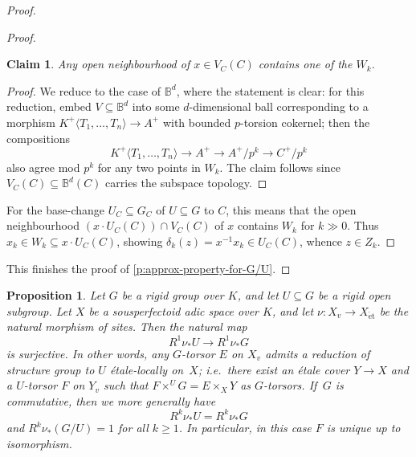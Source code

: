 \documentclass[11pt]{amsart}
\numberwithin{equation}{section}
\newtheorem{Proposition}[thm]{Proposition}
\newtheorem{Claim}[thm]{Claim}
\theoremstyle{definition}
\theoremstyle{remark}
\newcommand{\lra}{\longrightarrow}
\newcommand{\B}{\mathbb{B}}
\newcommand{\et}{{\operatorname{\acute{e}t}}}
\begin{document}
\begin{proof}
\begin{proof}
		\begin{Claim}
		Any open neighbourhood of $x\in V_C(C)$ contains one of the $W_k$.
		\end{Claim}

                \begin{proof}
		 We reduce to the case of $\B^d$, where the statement is clear: for this reduction, embed $V\subseteq \B^d$ into some $d$-dimensional ball corresponding to a morphism 
		 $K^+\langle T_1,\dots,T_n\rangle\to A^+$ with bounded $p$-torsion cokernel; then  the compositions 
		 \[K^+\langle T_1,\dots,T_n\rangle\lra A^+\lra A^+/p^k\lra C^+/p^k\] also agree mod $p^k$ for any two points in $W_k$. The claim follows since $V_C(C)\subseteq \B^d(C)$ carries the subspace topology.
		\end{proof}
                
		For the base-change $U_C\subseteq G_C$ of $U\subseteq G$ to $C$, this means that the open neighbourhood $(x\cdot U_C(C))\cap V_C(C)$ of $x$ contains  $W_k$ for $k\gg 0$. Thus $x_k\in W_k\subseteq  x\cdot U_C(C)$, showing $\delta_k(z)=x^{-1}x_k\in U_C(C)$, whence $z\in Z_k$.
	\end{proof}
        
This finishes the proof of \cref{p:approx-property-for-G/U}.
\end{proof}

\begin{Proposition}\label{p:reduction-of-structure-group-to-open-subgroup}
	Let $G$ be a rigid group over $K$, and let $U\subseteq G$ be a rigid open subgroup. Let $X$ be a sousperfectoid adic space over $K$, and let $\nu\colon X_v\to X_{\et}$ be the natural morphism of sites. Then the natural map
	\[ R^1\nu_{\ast}U\lra R^1\nu_{\ast}G\]
	is surjective. In other words, any $G$-torsor $E$ on $X_v$ admits a reduction of structure group to $U$ \'etale-locally on~$X$; \textit{i.e.}~there exist an \'etale cover $Y\to X$ and a $U$-torsor $F$ on $Y_v$ such that $F\times^UG=E\times_XY$ as $G$-torsors. If\, $G$ is commutative, then we more generally have 
	\[R^k\nu_{\ast}U= R^k\nu_{\ast}G\]
	and $R^k\nu_{\ast}(G/U)=1$ for all $k\geq 1$. In particular, in this case $F$ is unique up to isomorphism.
\end{Proposition}
\end{document}
